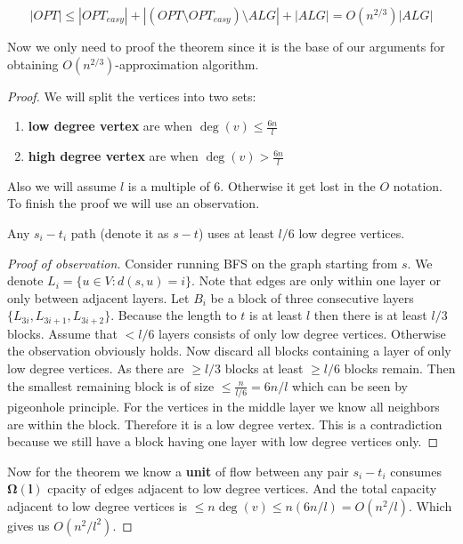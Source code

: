 $$
|OPT| \leq |OPT_{easy}| + |(OPT \setminus OPT_{easy}) \setminus ALG| + |ALG| = O(n^{2/3}) |ALG|
$$

Now we only need to proof the theorem since it is the base of our arguments for obtaining $O(n^{2/3})$-approximation algorithm.

\begin{proof}
	We will split the vertices into two sets:
	
	\begin{enumerate}
		\item \textbf{low degree vertex} are when $\deg(v) \leq \frac{6 n}{l}$
		\item \textbf{high degree vertex} are when $\deg(v) > \frac{6 n}{l}$
	\end{enumerate}
	
	Also we will assume $l$ is a multiple of 6. Otherwise it get lost in the $O$ notation. To finish the proof we will use an observation.
	
	\begin{observ}
		Any $s_{i}-t_{i}$ path (denote it as $s-t$) uses at least $l/6$ low degree vertices.
	\end{observ}
	
	\begin{proof}[Proof of observation]
		Consider running BFS on the graph starting from $s$. We denote $L_{i} = \{u \in V : d(s,u) = i\}$. Note that edges are only within one layer or only between adjacent layers. Let $B_{i}$ be a block of three consecutive layers $\{L_{3i}, L_{3i+1}, L_{3i+2}\}$. Because the length to $t$ is at least $l$ then there is at least $l/3$ blocks. Assume that $< l/6$ layers consists of only low degree vertices. Otherwise the observation obviously holds. Now discard all blocks containing a layer of only low degree vertices. As there are $\geq l/3$ blocks at least $\geq l/6$ blocks remain. Then the smallest remaining block is of size $\leq \frac{n}{l/6} = 6n/l$ which can be seen by pigeonhole principle. For the vertices in the middle layer we know all neighbors are within the block. Therefore it is a low degree vertex. This is a contradiction because we still have a block having one layer with low degree vertices only.
	\end{proof}
	
	Now for the theorem we know a \textbf{unit} of flow between any pair $s_{i}-t_{i}$ consumes $\mathbf{\Omega(l)}$ cpacity of edges adjacent to low degree vertices. And the total capacity adjacent to low degree vertices is $\leq n \deg(v) \leq n (6n/l) = O(n^2/l)$. Which gives us $O(n^2/l^2)$.
\end{proof}


